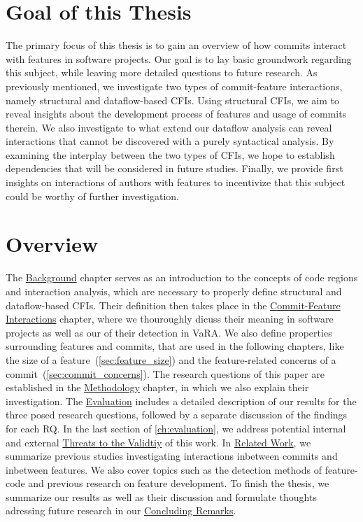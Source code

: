 \section{Goal of this Thesis}

The primary focus of this thesis is to gain an overview of how commits interact with features in software projects. 
Our goal is to lay basic groundwork regarding this subject, while leaving more detailed questions to future research. 
As previously mentioned, we investigate two types of commit-feature interactions, namely structural and dataflow-based CFIs. 
Using structural CFIs, we aim to reveal insights about the development process of features and usage of commits therein. 
We also investigate to what extend our dataflow analysis can reveal interactions that cannot be discovered with a purely syntactical analysis.
By examining the interplay between the two types of CFIs, we hope to establish dependencies that will be considered in future studies.
Finally, we provide first insights on interactions of authors with features to incentivize that this subject could be worthy of further investigation.

\section{Overview}

The \hyperref[ch:background]{Background} chapter serves as an introduction to the concepts of code regions and interaction analysis, which are necessary to properly define structural and dataflow-based CFIs.
Their definition then takes place in the \hyperref[ch:example_chapter]{Commit-Feature Interactions} chapter, where we thouroughly dicuss their meaning in software projects as well as our  of their detection in VaRA.
We also define properties surrounding features and commits, that are used in the following chapters, like the size of a feature~(\ref{sec:feature_size}) and the feature-related concerns of a commit~(\ref{sec:commit_concerns}).
The research questions of this paper are established in the \hyperref[ch:methodology]{Methodology} chapter, in which we also explain their investigation.
The \hyperref[ch:evaluation]{Evaluation} includes a detailed description of our results for the three posed research questions, followed by a separate discussion of the findings for each RQ. %
In the last section of \autoref{ch:evaluation}, we address potential internal and external \hyperref[sec:threats]{Threats to the Validtiy} of this work.
In \hyperref[ch:related_work]{Related Work}, we summarize previous studies investigating interactions inbetween commits and inbetween features.
We also cover topics such as the detection methods of feature-code and previous research on feature development. %
To finish the thesis, we summarize our results as well as their discussion and formulate thoughts adressing future research in our \hyperref[ch:conclusion]{Concluding Remarks}.




